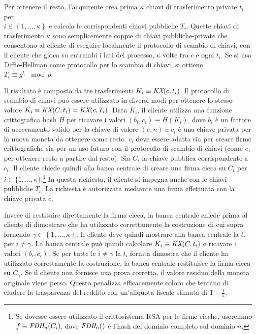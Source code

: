 \documentclass[a4paper]{article}
\begin{document}
Per ottenere il resto, l'acquirente crea prima $\kappa$ chiavi di
trasferimento private $t_{i}$ per \\ 
$i \in \left\{ 1,\ldots,\kappa \right\}$ e calcola le
corrispondenti chiavi pubbliche $T_{i}$. Queste chiavi di
trasferimento $\kappa$ sono semplicemente coppie di chiavi
pubbliche-private che consentono al cliente di eseguire localmente il
protocollo di scambio di chiavi, con il cliente che gioca su entrambi
i lati del processo, $\kappa$ volte tra $c$ e ogni $t_{i}$.
Se si usa Diffie-Hellman come protocollo per lo scambio di chiavi, si
ottiene
$T_{i} \equiv g^{t_{i}} \mod p$.

Il risultato è composto da tre trasferimenti
$K_{i} \equiv \emph{KX}(c,t_{i})$. Il protocollo di scambio di chiavi
può essere utilizzato in diversi modi per ottenere lo stesso valore
$K_{i} \equiv \emph{KX}(C,t_{i}) = \emph{KX}(c,T_{i})$.
Data $K_{i}$, il cliente utilizza una funzione crittografica hash $H$
per ricavare i valori
$(b_{i},c_{i}) \equiv H(K_{i})$, dove
$b_{i}$ è un fattore di accecamento valido per la chiave di valore
$(e,n)$ e $c_{i}$
è una chiave privata per la nuova moneta da ottenere come resto.
$c_{i}$ deve essere adatta sia per creare firme crittografiche sia per
un uso futuro con il protocollo di scambio di chiavi
(come $c$, per ottenere resto a partire dal resto).
Sia $C_{i}$ la chiave pubblica corrispondente a $c_{i}$.
Il cliente chiede quindi alla banca centrale di creare una firma cieca su
$C_{i}$ per $i \in \{ 1,\ldots,\kappa\}$.\footnote{Se dovesse essere
utilizzato il crittosistema RSA per le firme cieche, useremmo 
$f \equiv \emph{FDH}_{n}(C_{i})$, dove
$\emph{FDH}_{n}()$
è l'hash del dominio completo sul dominio $n$.} In questa richiesta, il
cliente si impegna anche con le chiavi pubbliche
$T_{i}$.
La richiesta è autorizzata mediante una firma effettuata con la chiave
privata $c$.

Invece di restituire direttamente la firma cieca, la banca centrale
chiede prima al cliente di dimostrare che ha utilizzato correttamente la
costruzione di cui sopra fornendo
$\gamma \in \left\{ 1,\ldots,\kappa \right\}$.
Il cliente deve quindi mostrare alla banca centrale la
$t_{i}$ per $i \neq \gamma$.
La banca centrale può quindi calcolare
$K_{i} \equiv \emph{KX}(C,t_{i})$ e ricavare i valori
$(b_{i},c_{i})$. Se per tutte le
$i \neq \gamma$ la $t_{i}$ fornita dimostra che il cliente ha utilizzato
correttamente la costruzione, la banca centrale restituisce la firma
cieca su $C_{\gamma}$.
Se il cliente non fornisce una prova corretta, il valore residuo della
moneta originale viene perso. Questo penalizza efficacemente coloro che
tentano di eludere la trasparenza del reddito con un'aliquota fiscale
stimata di $1 - \frac{1}{\kappa}$.
\end{document}
